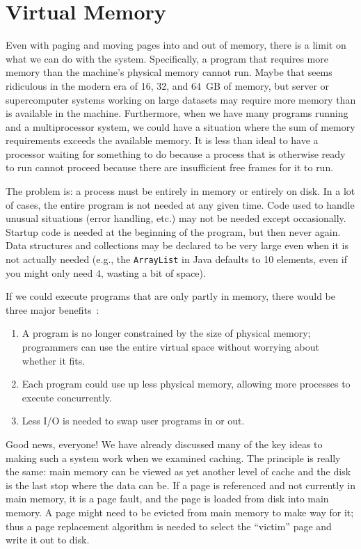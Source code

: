 




\section*{Virtual Memory}
Even with paging and moving pages into and out of memory, there is a limit on what we can do with the system. Specifically, a program that requires more memory than the machine's physical memory cannot run. Maybe that seems ridiculous in the modern era of 16, 32, and 64~GB of memory, but server or supercomputer systems working on large datasets may require more memory than is available in the machine. Furthermore, when we have many programs running and a multiprocessor system, we could have a situation where the sum of memory requirements exceeds the available memory. It is less than ideal to have a processor waiting for something to do because a process that is otherwise ready to run cannot proceed because there are insufficient free frames for it to run.

The problem is: a process must be entirely in memory or entirely on disk. In a lot of cases, the entire program is not needed at any given time. Code used to handle unusual situations (error handling, etc.) may not be needed except occasionally. Startup code is needed at the beginning of the program, but then never again. Data structures and collections may be declared to be very large even when it is not actually needed (e.g., the \texttt{ArrayList} in Java defaults to 10 elements, even if you might only need 4, wasting a bit of space).

If we could execute programs that are only partly in memory, there would be three major benefits~\cite{osc}:

\begin{enumerate}
	\item A program is no longer constrained by the size of physical memory; programmers can use the entire virtual space without worrying about whether it fits.
	\item Each program could use up less physical memory, allowing more processes to execute concurrently.
	\item Less I/O is needed to swap user programs in or out.
\end{enumerate}


Good news, everyone!  We have already discussed many of the key ideas to making such a system work when we examined caching. The principle is really the same: main memory can be viewed as yet another level of cache and the disk is the last stop where the data can be. If a page is referenced and not currently in main memory, it is a page fault, and the page is loaded from disk into main memory. A page might need to be evicted from main memory to make way for it; thus a page replacement algorithm is needed to select the ``victim'' page and write it out to disk. 

